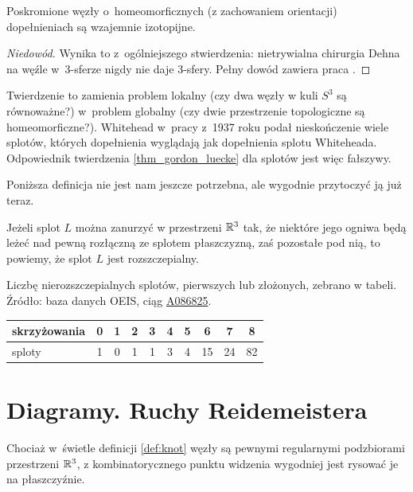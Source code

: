 \begin{theorem}
    \label{thm_gordon_luecke}
    Poskromione węzły o~homeomorficznych (z zachowaniem orientacji) dopełnieniach są wzajemnie izotopijne.
\end{theorem}

\begin{proof}[Niedowód]
    Wynika to z~ogólniejszego stwierdzenia:
    nietrywialna chirurgia Dehna na węźle w~3-sferze nigdy nie daje 3-sfery.
    Pełny dowód zawiera praca \cite{gordon89}.
\end{proof}

Twierdzenie to zamienia problem lokalny (czy dwa węzły w kuli $S^3$ są równoważne?) w~problem globalny (czy dwie przestrzenie topologiczne są homeomorficzne?).
Whitehead w~pracy \cite{whitehead37} z~1937 roku podał nieskończenie wiele splotów, których dopełnienia wyglądają jak dopełnienia splotu Whiteheada.
Odpowiednik twierdzenia \ref{thm_gordon_luecke} dla splotów jest więc fałszywy.

Poniższa definicja nie jest nam jeszcze potrzebna, ale wygodnie przytoczyć ją już teraz.

\begin{definition}[rozszczepialność]
    Jeżeli splot $L$ można zanurzyć w przestrzeni $\mathbb R^3$ tak, że niektóre jego ogniwa będą leżeć nad pewną rozłączną ze splotem płaszczyzną, zaś pozostałe pod nią, to powiemy, że splot $L$ jest rozszczepialny.
\end{definition}

Liczbę nierozszczepialnych splotów, pierwszych lub złożonych, zebrano w tabeli.
Źródło: baza danych OEIS, ciąg \href{https://oeis.org/A086825}{A086825}.

\renewcommand*{\arraystretch}{1.4}
\footnotesize
\begin{longtable}{lccccccccc}
    \hline
    \textbf{skrzyżowania}  &  0  &  1  &  2  &  3  &  4  &  5  &  6   &  7   &  8   \\  \hline  \endhead
    sploty                 &  1  &  0  &  1  &  1  &  3  &  4  &  15  &  24  &  82  \\
    \hline
\end{longtable}
\normalsize

\section{Diagramy. Ruchy Reidemeistera}
Chociaż w~świetle definicji \ref{def:knot} węzły są pewnymi regularnymi podzbiorami przestrzeni $\mathbb R^3$,
z kombinatorycznego punktu widzenia wygodniej jest rysować je na płaszczyźnie.


